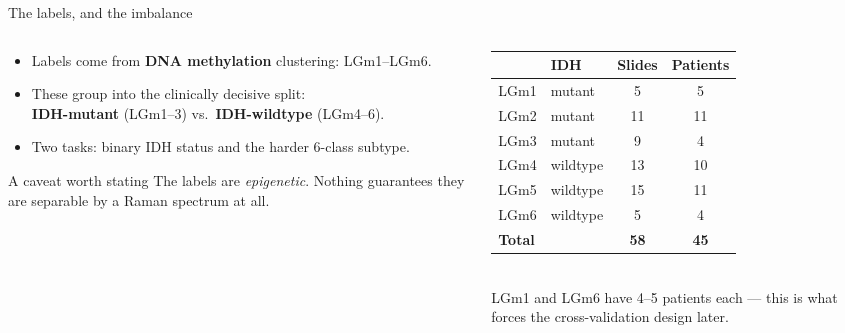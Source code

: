 \documentclass[aspectratio=169, 11pt]{beamer}
\newcommand{\srcnote}[1]{{\scriptsize\color{gray}#1}}
\begin{document}
\begin{frame}{The labels, and the imbalance}
  \vspace{0.3em}
  \begin{columns}[T]
    \begin{column}{0.52\textwidth}
      \small
      \begin{itemize}\setlength\itemsep{0.6em}
        \item Labels come from \textbf{DNA methylation} clustering:
              LGm1--LGm6.
        \item These group into the clinically decisive split:\\
              \textbf{IDH-mutant} (LGm1--3) vs.\ \textbf{IDH-wildtype} (LGm4--6).
        \item Two tasks: \alert{binary IDH status} and the harder
              \alert{6-class subtype}.
      \end{itemize}
      \vspace{0.8em}
      \begin{block}{\small A caveat worth stating}
        \small The labels are \emph{epigenetic}. Nothing guarantees they are
        separable by a Raman spectrum at all.
      \end{block}
    \end{column}
    \begin{column}{0.46\textwidth}
      \centering
      \small
      \begin{tabular}{llcc}
        \toprule
        & \textbf{IDH} & \textbf{Slides} & \textbf{Patients}\\
        \midrule
        LGm1 & mutant   & 5  & 5\\
        LGm2 & mutant   & 11 & 11\\
        LGm3 & mutant   & 9  & 4\\
        \midrule
        LGm4 & wildtype & 13 & 10\\
        LGm5 & wildtype & 15 & 11\\
        LGm6 & wildtype & 5  & 4\\
        \midrule
        \textbf{Total} & & \textbf{58} & \textbf{45}\\
        \bottomrule
      \end{tabular}\\[0.7em]
      \srcnote{LGm1 and LGm6 have 4--5 patients each --- this is what forces
        the cross-validation design later.}
    \end{column}
  \end{columns}
\end{frame}
\end{document}
